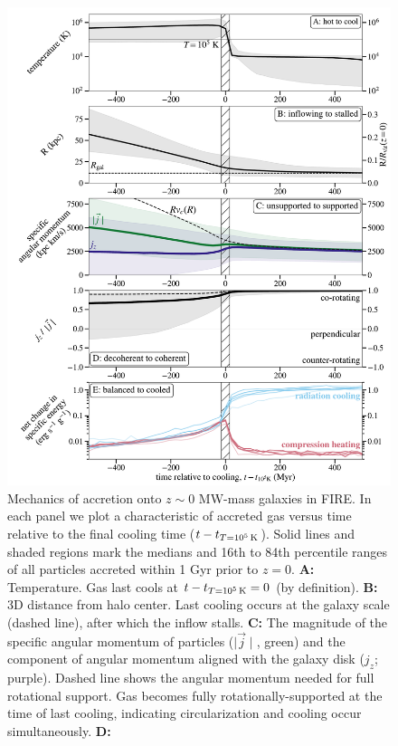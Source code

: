 \documentclass[fleqn,usenatbib]{mnras}
\newcommand{\tcon}{t_{T=10^5\,{\rm K}}}
\begin{document}
\begin{figure}
\includegraphics[height=0.75\textheight]{figures/before_and_after/before_and_after_m12i_md.pdf}
\caption{
Mechanics of accretion onto $z\sim0$ MW-mass galaxies in FIRE.
In each panel we plot a characteristic of accreted gas versus time relative to the final cooling time ($t - \tcon$).
Solid lines and shaded regions mark the medians and 16th to 84th percentile ranges of all particles accreted within 1 Gyr prior to $z=0$.
\textbf{A:} Temperature. Gas last cools at $t - \tcon = 0$ (by definition).
\textbf{B:}
3D distance from halo center. 
Last cooling occurs at the galaxy scale (dashed line), after which the inflow stalls.
\textbf{C:}
The magnitude of the specific angular momentum of particles ($\mid\vec{j}\mid$, green) and the component of angular momentum aligned with the galaxy disk ($j_z$; purple).
Dashed line shows the angular momentum needed for full rotational support.
Gas becomes fully rotationally-supported at the time of last cooling, indicating circularization and cooling occur simultaneously.
\textbf{D:}
}
\end{figure}
\end{document}
